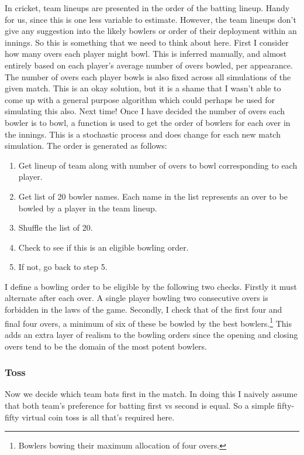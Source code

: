 In cricket, team lineups are presented in the order of the batting lineup. Handy for us, since this is one less variable to estimate. However, the team lineups don't give any suggestion into the likely bowlers or order of their deployment within an innings. So this is something that we need to think about here. First I consider how many overs each player might bowl. This is inferred manually, and almost entirely based on each player's average number of overs bowled, per appearance. The number of overs each player bowls is also fixed across all simulations of the given match. This is an okay solution, but it is a shame that I wasn't able to come up with a general purpose algorithm which could perhaps be used for simulating this also. Next time! Once I have decided the number of overs each bowler is to bowl, a function is used to get the order of bowlers for each over in the innings. This is a stochastic process and does change for each new match simulation. The order is generated as follows:

\begin{enumerate}
    \itemsep-0.25em
    \item Get lineup of team along with number of overs to bowl corresponding to each player.
    \item Get list of 20 bowler names. Each name in the list represents an over to be bowled by a player in the team lineup.
    \item Shuffle the list of 20.
    \item Check to see if this is an eligible bowling order.
    \item If not, go back to step 5.
\end{enumerate}

I define a bowling order to be eligible by the following two checks. Firstly it must alternate after each over. A single player bowling two consecutive overs is forbidden in the laws of the game. Secondly, I check that of the first four and final four overs, a minimum of six of these be bowled by the best bowlers.\footnote{Bowlers bowing their maximum allocation of four overs.} This adds an extra layer of realism to the bowling orders since the opening and closing overs tend to be the domain of the most potent bowlers.

\subsubsection{Toss}

Now we decide which team bats first in the match. In doing this I naively assume that both team's preference for batting first vs second is equal. So a simple fifty-fifty virtual coin toss is all that's required here.

